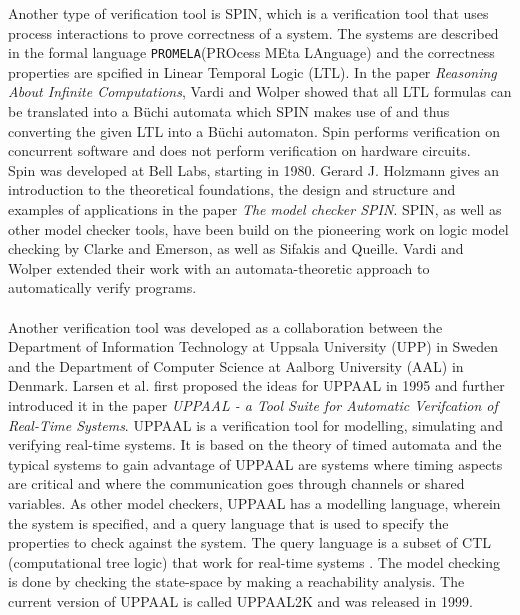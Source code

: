 Another type of verification tool is SPIN\cite{spin}, which is a verification tool that uses process interactions to prove correctness of a system. The systems are described in the formal language \texttt{PROMELA}(PROcess MEta LAnguage)\cite{Holzmann1991} and the correctness properties are spcified in Linear Temporal Logic (LTL)\cite{Pnueli1977}. In the paper \textit{Reasoning About Infinite Computations}\cite{Vardi1994}, Vardi and Wolper showed that all LTL formulas can be translated into a B\"uchi automata which SPIN makes use of and thus converting the given LTL into a B\"uchi automaton. Spin performs verification on concurrent software and does not perform verification on hardware circuits. \\
Spin was developed at Bell Labs, starting in 1980. Gerard J. Holzmann gives an introduction to the theoretical foundations, the design and structure and examples of applications in the paper \textit{The model checker SPIN}\cite{Holzmann1997}. SPIN, as well as other model checker tools, have been build on the pioneering work on logic model checking by Clarke and Emerson\cite{Clarke1981}, as well as Sifakis and Queille\cite{Queille1982}.
Vardi and Wolper extended their work with an automata-theoretic approach to automatically verify programs\cite{Vardi1986}.\\\\
Another verification tool was developed as a collaboration between the Department of Information Technology at Uppsala University (UPP) in Sweden and the Department of Computer Science at Aalborg University (AAL) in Denmark. Larsen et al. first proposed the ideas for UPPAAL\cite{Larsen1995} in 1995 and further introduced it in the paper \textit{UPPAAL - a Tool Suite for Automatic Verifcation of Real-Time Systems}\cite{Bengtsson1995}.
UPPAAL is a verification tool for modelling, simulating and verifying real-time systems. It is based on the theory of timed automata\cite{Hopcroft2001}\cite{Alur1990} and the typical systems to gain advantage of UPPAAL are systems where timing aspects are critical and where the communication goes through channels or shared variables.
As other model checkers, UPPAAL has a modelling language, wherein the system is specified, and a query language that is used to specify the properties to check against the system. The query language is a subset of CTL (computational tree logic) that work for real-time systems\cite{Henzinger1994} \cite{Larsen1995}. The model checking is done by checking the state-space by making a reachability analysis. The current version of UPPAAL is called UPPAAL2K and was released in 1999\cite{Amnell2001}. \\\\
